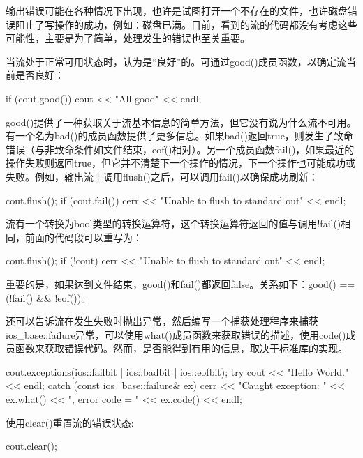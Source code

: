 
输出错误可能在各种情况下出现，也许是试图打开一个不存在的文件，也许磁盘错误阻止了写操作的成功，例如：磁盘已满。目前，看到的流的代码都没有考虑这些可能性，主要是为了简单，处理发生的错误也至关重要。

当流处于正常可用状态时，认为是“良好”的。可通过good()成员函数，以确定流当前是否良好：

\begin{cpp}
if (cout.good()) {
    cout << "All good" << endl;
}
\end{cpp}

good()提供了一种获取关于流基本信息的简单方法，但它没有说为什么流不可用。有一个名为bad()的成员函数提供了更多信息。如果bad()返回true，则发生了致命错误（与非致命条件如文件结束，eof()相对）。另一个成员函数fail()，如果最近的操作失败则返回true，但它并不清楚下一个操作的情况，下一个操作也可能成功或失败。例如，输出流上调用flush()之后，可以调用fail()以确保成功刷新：

\begin{cpp}
cout.flush();
if (cout.fail()) {
    cerr << "Unable to flush to standard out" << endl;
}
\end{cpp}

流有一个转换为bool类型的转换运算符，这个转换运算符返回的值与调用!fail()相同，前面的代码段可以重写为：

\begin{cpp}
cout.flush();
if (!cout) {
    cerr << "Unable to flush to standard out" << endl;
}
\end{cpp}

重要的是，如果达到文件结束，good()和fail()都返回false。关系如下：good() == (!fail() \&\& !eof())。

还可以告诉流在发生失败时抛出异常，然后编写一个捕获处理程序来捕获ios\_base::failure异常，可以使用what()成员函数来获取错误的描述，使用code()成员函数来获取错误代码。然而，是否能得到有用的信息，取决于标准库的实现。

\begin{cpp}
cout.exceptions(ios::failbit | ios::badbit | ios::eofbit);
try {
    cout << "Hello World." << endl;
} catch (const ios_base::failure& ex) {
    cerr << "Caught exception: " << ex.what()
    << ", error code = " << ex.code() << endl;
}
\end{cpp}

使用clear()重置流的错误状态:

\begin{cpp}
cout.clear();
\end{cpp}

